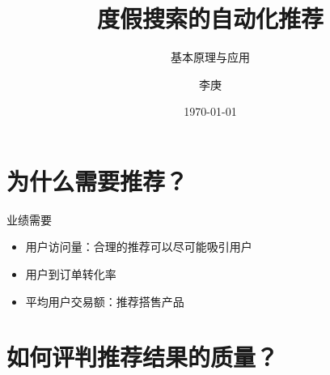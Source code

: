 \documentclass{beamer}
\begin{document}
\begin{CJK}{UTF8}{gbsn}

\title{度假搜索的自动化推荐}

\subtitle{基本原理与应用}

\author{李庚}


\date{\today}




\begin{frame}
  \titlepage
\end{frame}


\section{为什么需要推荐？}

\begin{frame}{业绩需要}
  \begin{itemize}
    \item {用户访问量：合理的推荐可以尽可能吸引用户}
    \item {用户到订单转化率}
    \item {平均用户交易额：推荐搭售产品}
  \end{itemize}  
\end{frame}

\section{如何评判推荐结果的质量？}


\end{CJK}
\end{document}
